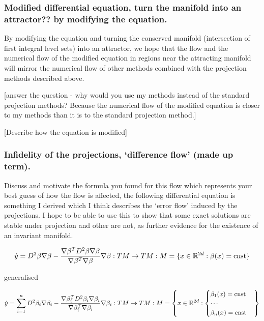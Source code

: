 \documentclass[12pt]{article}
\begin{document}
\subsubsection{Modified differential equation, turn the manifold into an attractor?? by modifying the equation.}

By modifying the equation and turning the conserved manifold (intersection of first integral level sets) into an attractor, we hope that the flow and the numerical flow of the modified equation in regions near the attracting manifold will mirror the numerical flow of other methods combined with the projection methods described above. 

[answer the question - why would you use my methods instead of the standard projection methods? Because the numerical flow of the modified equation is closer to my methods than it is to the standard projection method.]

[Describe how the equation is modified]

\subsubsection{Infidelity of the projections, `difference flow' (made up term).}

Discuss and motivate the formula you found for this flow which represents your best guess of how the flow is affected, the following differential equation is something I derived which I think describes the `error flow' induced by the projections. I hope to be able to use this to show that some exact solutions are stable under projection and other are not, as further evidence for the existence of an invariant manifold. 

\begin{equation}\label{eq:differnece flow}
\dot y = D^2\beta \nabla\beta - \frac{\nabla\beta^T D^2\beta \nabla\beta}{\nabla\beta^T\nabla\beta} \nabla\beta : TM\to TM : M = \{x\in\mathbb{R}^{2d} : \beta(x) = \text{cnst} \}
\end{equation}

generalised

\begin{equation}\label{eq:difference flow many}
\dot y = \sum_{i=1}^n D^2\beta_i \nabla\beta_i - \frac{\nabla\beta_i^T D^2\beta_i\nabla\beta_i}{\nabla\beta_i^T\nabla\beta_i} \nabla\beta_i : TM\to TM : M = \left\{x\in\mathbb{R}^{2d} : \begin{cases}\beta_1(x)=\text{cnst}\\\cdots\\\beta_n(x)=\text{cnst}\end{cases}\right\}
\end{equation}
\end{document}
